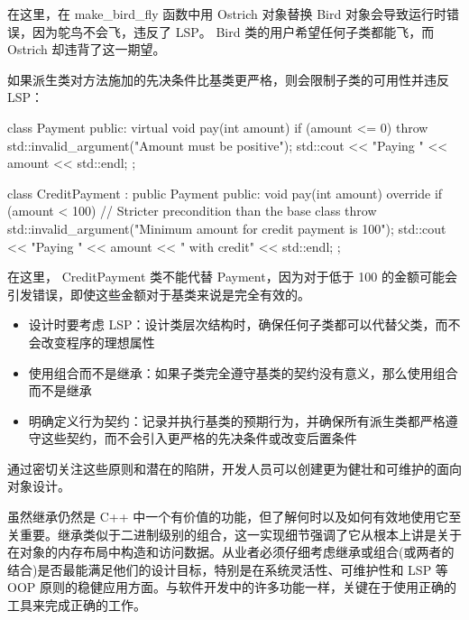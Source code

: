 在这里，在 make\_bird\_fly 函数中用 Ostrich 对象替换 Bird 对象会导致运行时错误，因为鸵鸟不会飞，违反了 LSP。 Bird 类的用户希望任何子类都能飞，而 Ostrich 却违背了这一期望。


如果派生类对方法施加的先决条件比基类更严格，则会限制子类的可用性并违反 LSP：

\begin{cpp}
class Payment {
public:
    virtual void pay(int amount) {
        if (amount <= 0) {
            throw std::invalid_argument("Amount must be positive");
        }
        std::cout << "Paying " << amount << std::endl;
    }
};

class CreditPayment : public Payment {
public:
    void pay(int amount) override {
        if (amount < 100) { // Stricter precondition than the base
            class
            throw std::invalid_argument("Minimum amount for credit payment is 100");
        }
        std::cout << "Paying " << amount << " with credit" <<
        std::endl;
    }
};
\end{cpp}

在这里， CreditPayment 类不能代替 Payment，因为对于低于 100 的金额可能会引发错误，即使这些金额对于基类来说是完全有效的。


\begin{itemize}
\item
设计时要考虑 LSP：设计类层次结构时，确保任何子类都可以代替父类，而不会改变程序的理想属性

\item
使用组合而不是继承：如果子类完全遵守基类的契约没有意义，那么使用组合而不是继承

\item
明确定义行为契约：记录并执行基类的预期行为，并确保所有派生类都严格遵守这些契约，而不会引入更严格的先决条件或改变后置条件
\end{itemize}

通过密切关注这些原则和潜在的陷阱，开发人员可以创建更为健壮和可维护的面向对象设计。

虽然继承仍然是 C++ 中一个有价值的功能，但了解何时以及如何有效地使用它至关重要。继承类似于二进制级别的组合，这一实现细节强调了它从根本上讲是关于在对象的内存布局中构造和访问数据。从业者必须仔细考虑继承或组合(或两者的结合)是否最能满足他们的设计目标，特别是在系统灵活性、可维护性和 LSP 等 OOP 原则的稳健应用方面。与软件开发中的许多功能一样，关键在于使用正确的工具来完成正确的工作。
















